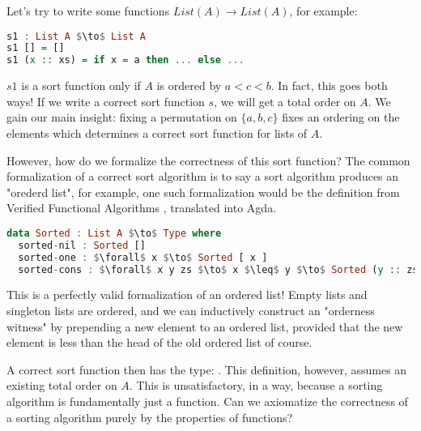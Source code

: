 Let's try to write some functions $List(A) \to List(A)$, for example:
\begin{lstlisting}[language=haskell]
s1 : List A $\to$ List A
s1 [] = []
s1 (x :: xs) = if x = a then ... else ...
\end{lstlisting}
$s1$ is a sort function only if $A$ is ordered by $a < c < b$.
In fact, this goes both ways!
If we write a correct sort function $s$, we will get a total order on $A$.
We gain our main insight: fixing a permutation on $\{a,b,c\}$ fixes an ordering on the elements which determines a correct sort function for lists of $A$.


However, how do we formalize the correctness of this sort function?
The common formalization of a correct sort algorithm is to say a sort algorithm produces
an "orederd list", for example, one such formalization would be the definition
from Verified Functional Algorithms \cite{appel2016verified}, translated into Agda.

\begin{lstlisting}[language=Haskell]
data Sorted : List A $\to$ Type where
  sorted-nil : Sorted []
  sorted-one : $\forall$ x $\to$ Sorted [ x ]
  sorted-cons : $\forall$ x y zs $\to$ x $\leq$ y $\to$ Sorted (y :: zs) $\to$ Sorted (x :: y :: zs)
\end{lstlisting}

This is a perfectly valid formalization of an ordered list! Empty lists and singleton lists
are ordered, and we can inductively construct an "orderness witness" by prepending a new element
to an ordered list, provided that the new element is less than the head of the old ordered list of
course. 

A correct sort function then has the type: .
This definition, however, assumes an existing total order on $A$. This is
unsatisfactory, in a way, because a sorting algorithm is fundamentally just a function. Can we
axiomatize the correctness of a sorting algorithm purely by the properties of functions?

